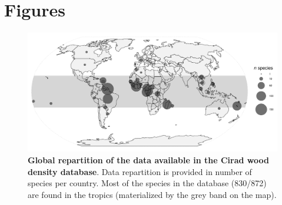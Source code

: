 \documentclass[a4paper, 12pt, leqno, dvipsnames]{article}\usepackage[]{graphicx}\usepackage[]{color}
\begin{document}
\newpage

\section{Figures}

\vfill
\begin{figure}[!ht] 
    \begin{center} 
      \includegraphics[width=\textwidth]{figs/Location.pdf}

      \caption{\textbf{Global repartition of the data available in the Cirad wood density database}. Data repartition is provided in number of species per country. Most of the species in the database (830/872) are found in the tropics (materialized by the grey band on the map).}

      \label{fig:Location}
    \end{center}
\end{figure}
\vfill

\newpage
\end{document}
